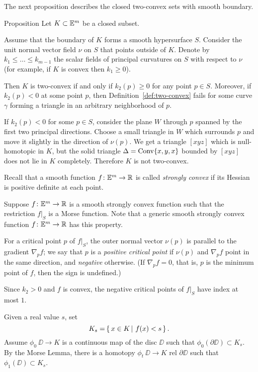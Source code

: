 The next proposition describes the closed two-convex sets with smooth boundary.

\begin{thm}{Proposition}\label{prop:two-cove+smooth}
Let $K\subset \EE^m$ be a closed subset.

Assume that the boundary of $K$ forms a smooth hypersurface $S$.
Consider the unit normal vector field $\nu$ on $S$ that  points outside of $K$.
Denote by $k_1\le \dots\le k_{m-1}$ the scalar fields of principal curvatures on $S$ with respect to $\nu$ (for example, if $K$ is convex then  $k_1\ge 0$).

Then $K$ is two-convex if and only if $k_2(p)\ge 0$ for any point $p\in S$.
Moreover, if $k_2(p)<0$ at some point $p$, then Definition~\ref{def:two-convex} fails for some curve $\gamma$ forming a triangle in an arbitrary neighborhood of $p$.
\end{thm}



If $k_2(p)<0$ for some $p\in S$,
consider the plane $W$ through $p$  spanned by the first two principal directions.
Choose a small triangle in $W$ which surrounds $p$ and move it slightly in the direction of $\nu(p)$.
We get a triangle $[xyz]$ which is null-homotopic in $K$,
but the solid triangle $\Delta=\mathop{\rm Conv}\nolimits\{x,y,x\}$ bounded by $[xyz]$ does not lie in $K$ completely.
Therefore $K$ is not two-convex.




Recall that a smooth function $f\:\EE^m\to\RR$ is called \emph{strongly convex} if its Hessian is
 positive definite at each point.


Suppose $f\:\EE^m\to\RR$ is a smooth strongly
convex function 
such that the restriction $f|_S$ is a Morse function.
Note that a generic smooth strongly convex function $f\:\EE^m\to\RR$ has this property.

For a critical point $p$ of $f|_S$, the outer normal vector $\nu(p)$ is parallel to the gradient $\nabla_pf$;
we say that $p$ is a \emph{positive critical point}
if $\nu(p)$ and $\nabla_p f$ point in the same direction, 
and \emph{negative} otherwise.
(If $\nabla_pf=0$, that is, $p$ is the minimum point of $f$, then the sign is undefined.)

Since 
$k_2>0$ and $f$ is convex, 
the negative critical points of $f|_S$
have index at most $1$.

Given a real value $s$, set 
\[K_s=\set{x\in K}{f(x)<s}.\]
Assume  $\phi_0\:\DD\to K$ is a continuous map of the disc $\DD$
such that $\phi_0(\partial \DD)\subset K_s$.
By the Morse Lemma, 
there is a homotopy $\phi_t\:\DD\to K$ rel $\partial \DD$ such that 
$\phi_1(\DD)\subset K_s$.

